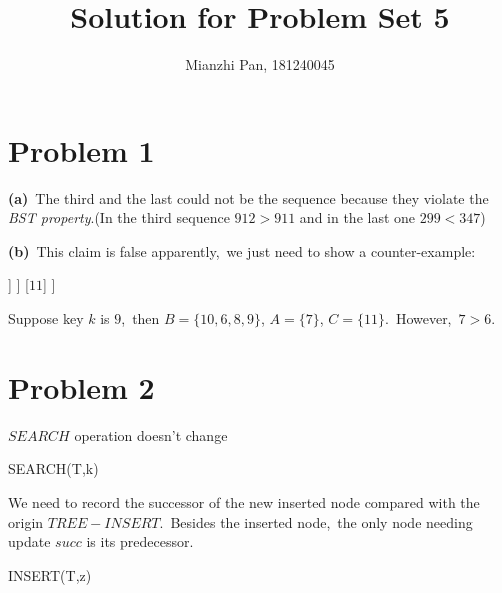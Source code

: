 \documentclass[]{article}
\title{Solution for Problem Set 5}
\author{Mianzhi Pan, 181240045}
\begin{document}
	\maketitle
	\section{Problem 1}
	\textbf{(a)}\ The third and the last could not be the sequence because they violate the \textit{BST property}.(In the third sequence $912>911$ and in the last one $299<347$)
	
	\textbf{(b)}\ This claim is false apparently,\ we just need to show a counter-example:
	
	\begin{forest}
	[$10$
		[$6$
			[$\cdots$]
			[$8$
				[$7$]
				[$9$]
			]
		]
		[$11$]
	]		
	\end{forest}   
	
	Suppose key $k$ is $9$,\ then $B = \{10, 6, 8, 9\}$, $A = \{7\}$, $C = \{11\}$.\ However,\ $7 > 6$. 
	
	\section{Problem 2}
	$SEARCH$ operation doesn't change
	\begin{algorithm}[H]
		\caption{SEARCH(T,k)} %
		\begin{algorithmic}[1]
		\Else
		\EndIf
		\EndWhile	
		\end{algorithmic}
	\end{algorithm}

    We need to record the successor of the new inserted node compared with the origin $TREE-INSERT$.\ Besides the inserted node,\ the only node needing update $succ$ is its predecessor.\
	\begin{algorithm}[H]
	\caption{INSERT(T,z)} %
	\begin{algorithmic}[1]
	\Else
	\EndIf
	\EndWhile
	\Else
	\EndIf
	\end{algorithmic}
	\end{algorithm}
\end{document}
